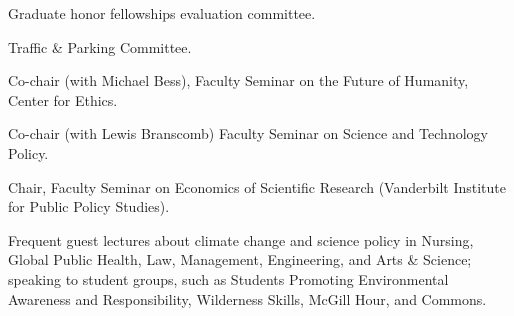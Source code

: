 \item[2013] Graduate honor fellowships evaluation committee.
\item[2010--2013] Traffic \& Parking Committee.
\item[2008] Co-chair (with Michael Bess), Faculty Seminar on the Future of Humanity, Center for Ethics.
\item[1999--2000] Co-chair (with Lewis Branscomb) Faculty Seminar on Science and Technology Policy.
\item[1996--1997] Chair, Faculty Seminar on Economics of Scientific Research (Vanderbilt Institute for Public Policy Studies).
\item[Ongoing] Frequent guest lectures about climate change and science policy in Nursing, Global Public Health, Law, Management, Engineering, and Arts \& Science; speaking to student groups, such as Students Promoting Environmental Awareness and Responsibility, Wilderness Skills, McGill Hour, and Commons.

